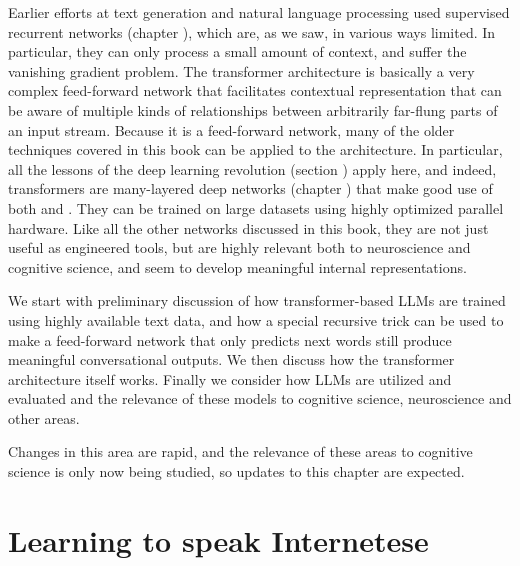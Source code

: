 Earlier efforts at text generation and natural language processing used supervised recurrent networks (chapter ), which are, as we saw, in various ways limited. In particular, they can only process a small amount of context, and suffer the vanishing gradient problem. The transformer architecture is basically a very complex feed-forward network that facilitates contextual representation that can be aware of multiple kinds of relationships between arbitrarily far-flung parts of an input stream. Because it is a feed-forward network, many of the older techniques covered in this book can be applied to the architecture. In particular, all the lessons of the deep learning revolution (section ) apply here, and indeed, transformers are many-layered deep networks (chapter ) that make good use of both  and . They can be trained on large datasets using highly optimized parallel hardware. Like all the other networks discussed in this book, they are not just useful as engineered tools, but are highly relevant both to neuroscience and cognitive science, and seem to develop meaningful internal representations. 

We start with preliminary discussion of how transformer-based LLMs are trained using highly available text data, and how a special recursive trick can be used to make a feed-forward network that only predicts next words still produce meaningful conversational outputs. We then discuss how the transformer architecture itself works.  Finally we consider how LLMs are utilized and evaluated and the relevance of these models to cognitive science, neuroscience and other areas.

Changes in this area are rapid, and the relevance of these areas to cognitive science is only now being studied, so updates to this chapter are expected.

\section{Learning to speak Internetese}

